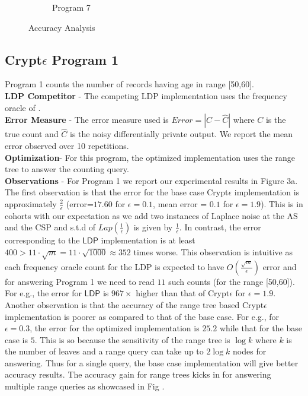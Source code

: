 \begin{figure}
\begin{subfigure}[b]{0.3\textwidth}
        \caption{Program 7}
        \label{fig:mouse}
    \end{subfigure}
   \caption{Accuracy Analysis}
\end{figure}
\subsection*{Crypt$\epsilon$ Program 1}
Program 1 counts the number of records having age in range [50,60].  
\\\textbf{\textsf{LDP} Competitor} - The competing \textsf{LDP} implementation uses the frequency oracle of \cite{LDP1}. 
\\\textbf{Error Measure} - The error measure used is  $Error = |C-\hat{C}|$ where $C$ is the true count and $\hat{C}$ is the noisy differentially private output. We report the mean error observed over 10 repetitions. \\
\textbf{Optimization}- For this program, the optimized implementation uses the range tree to answer the counting query.
\\\textbf{Observations} - For Program 1 we report our experimental results in Figure 3a. The first observation is that the error for the base case Crypt$\epsilon$ implementation is approximately $\frac{2}{\epsilon}$ (error=$17.60$ for $\epsilon=0.1$, mean error = $0.1$ for $\epsilon=1.9$). This is in cohorts with our expectation as we add two instances of Laplace noise at the \textsf{AS} and the \textsf{CSP} and s.t.d of $Lap(\frac{1}{\epsilon})$ is given by $\frac{1}{\epsilon}$. In contrast, the error corresponding to the $\textsf{LDP}$ implementation is at least $400 >11\cdot \sqrt{m}=  11\cdot \sqrt{1000} \approx 352$ times worse. This observation is intuitive as each frequency oracle count for the \textsf{LDP} is expected to have $O(\frac{\sqrt{m}}{\epsilon})$ error and for answering Program 1 we need to read $11$  such counts (for the range [50,60]). For e.g., the error for $\textsf{LDP}$ is $967 \times$  higher than that of Crypt$\epsilon$ for $\epsilon=1.9$. Another observation is that the accuracy of the range tree based Crypt$\epsilon$ implementation is poorer as compared to that of the base case. For e.g., for $\epsilon=0.3$, the error for the optimized implementation is $25.2$ while that for the base case is $5$. This is so because the sensitivity of the range tree is $\log k$ where $k$ is the number of leaves and a range query can take up to $2 \log k$ nodes for answering. Thus for a single query, the base case implementation will give better accuracy results. The accuracy gain for range trees kicks in for answering multiple range queries as showcased in Fig .  
